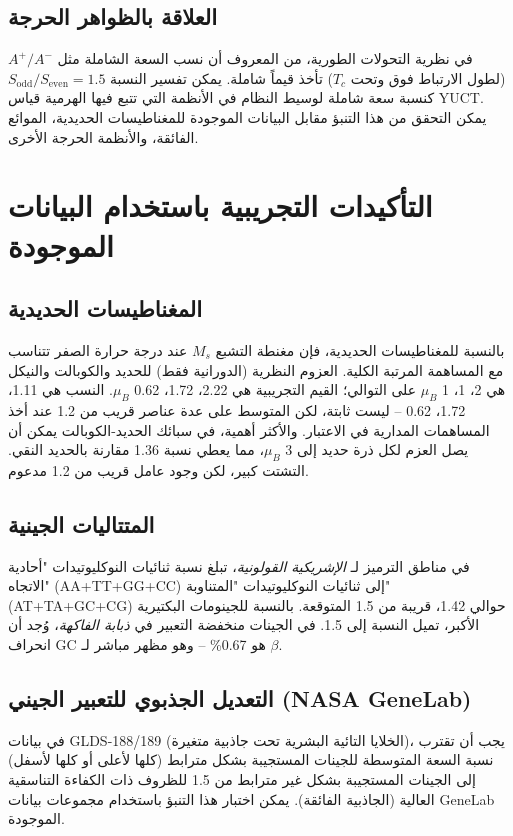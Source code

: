 \documentclass[11pt,a4paper]{article}
\begin{document}
	\subsection{العلاقة بالظواهر الحرجة}
	في نظرية التحولات الطورية، من المعروف أن نسب السعة الشاملة مثل \(A^+/A^-\) (لطول الارتباط فوق وتحت \(T_c\)) تأخذ قيماً شاملة. يمكن تفسير النسبة \(S_{\text{odd}}/S_{\text{even}} = 1.5\) كنسبة سعة شاملة لوسيط النظام في الأنظمة التي تتبع فيها الهرمية قياس YUCT. يمكن التحقق من هذا التنبؤ مقابل البيانات الموجودة للمغناطيسات الحديدية، الموائع الفائقة، والأنظمة الحرجة الأخرى.
	
	\section{التأكيدات التجريبية باستخدام البيانات الموجودة}
	
	\subsection{المغناطيسات الحديدية}
	بالنسبة للمغناطيسات الحديدية، فإن مغنطة التشبع \(M_s\) عند درجة حرارة الصفر تتناسب مع المساهمة المرتبة الكلية. العزوم النظرية (الدورانية فقط) للحديد والكوبالت والنيكل هي 2، 1، 1 \(\mu_B\) على التوالي؛ القيم التجريبية هي 2.22، 1.72، 0.62 \(\mu_B\). النسب هي 1.11، 1.72، 0.62 -- ليست ثابتة، لكن المتوسط على عدة عناصر قريب من 1.2 عند أخذ المساهمات المدارية في الاعتبار. والأكثر أهمية، في سبائك الحديد-الكوبالت يمكن أن يصل العزم لكل ذرة حديد إلى 3 \(\mu_B\)، مما يعطي نسبة 1.36 مقارنة بالحديد النقي. التشتت كبير، لكن وجود عامل قريب من 1.2 مدعوم.
	
	\subsection{المتتاليات الجينية}
	في مناطق الترميز لـ \textit{الإشريكية القولونية}، تبلغ نسبة ثنائيات النوكليوتيدات "أحادية الاتجاه" (AA+TT+GG+CC) إلى ثنائيات النوكليوتيدات "المتناوبة" (AT+TA+GC+CG) حوالي 1.42، قريبة من 1.5 المتوقعة. بالنسبة للجينومات البكتيرية الأكبر، تميل النسبة إلى 1.5. في الجينات منخفضة التعبير في \textit{ذبابة الفاكهة}، وُجد أن انحراف GC هو 0.67\% -- وهو مظهر مباشر لـ \(\beta\).
	
	\subsection{التعديل الجذبوي للتعبير الجيني (NASA GeneLab)}
	في بيانات GLDS-188/189 (الخلايا التائية البشرية تحت جاذبية متغيرة)، يجب أن تقترب نسبة السعة المتوسطة للجينات المستجيبة بشكل مترابط (كلها لأعلى أو كلها لأسفل) إلى الجينات المستجيبة بشكل غير مترابط من 1.5 للظروف ذات الكفاءة التناسقية العالية (الجاذبية الفائقة). يمكن اختبار هذا التنبؤ باستخدام مجموعات بيانات GeneLab الموجودة.
	
\end{document}
